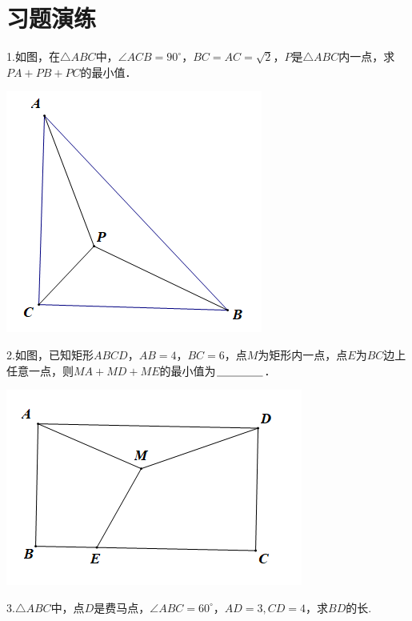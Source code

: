 \documentclass[10pt]{ctexart}
\begin{document}
\section{习题演练}
\begin{shaded}
1.如图，在$\triangle ABC$中，$\angle ACB=90^\circ$，$BC=AC=\sqrt{2}$，$P$是$\triangle ABC$内一点，求$PA+PB+PC$的最小值．
\end{shaded}

\begin{center}
	\includegraphics[scale=0.5]{figure/feimadian14}
\end{center}

\begin{shaded}
2.如图，已知矩形$ABCD$，$AB=4$，$BC=6$，点$M$为矩形内一点，点$E$为$BC$边上任意一点，则$MA+MD+ME$的最小值为$\underline{\hspace{1.5cm}}$．
\end{shaded}

\begin{center}
	\includegraphics[scale=0.5]{figure/feimadian15}
\end{center}

\begin{shaded}
3.$\triangle ABC$中，点$D$是费马点，$\angle ABC=60^\circ$，$AD=3,CD=4$，求$BD$的长.
\end{shaded}
\end{document}
